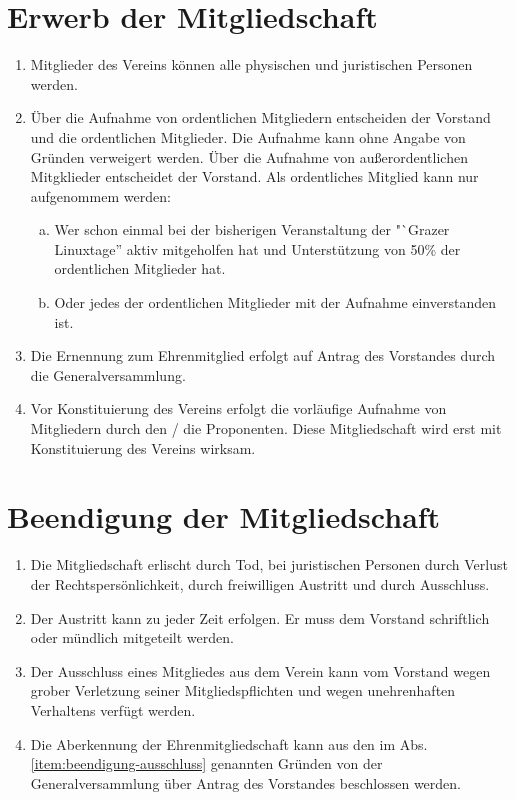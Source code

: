 \documentclass[a4paper,12pt]{article}
\begin{document}
\section{Erwerb der Mitgliedschaft} %
\label{sec:Mitgliedschaft-Erwerb}
\begin{enumerate}
\item Mitglieder des Vereins können alle physischen und juristischen Personen werden.
\item  Über die Aufnahme von ordentlichen Mitgliedern entscheiden der Vorstand und die ordentlichen Mitglieder. Die Aufnahme kann ohne Angabe von Gründen verweigert werden. Über die Aufnahme von außerordentlichen Mitgklieder entscheidet der Vorstand. Als ordentliches Mitglied kann nur aufgenommem werden:
\begin{enumerate}[(a)]
  \item Wer schon einmal bei der bisherigen Veranstaltung der "`Grazer Linuxtage'' aktiv mitgeholfen hat und Unterstützung von 50\% der ordentlichen Mitglieder hat.
  \item Oder jedes der ordentlichen Mitglieder mit der Aufnahme einverstanden ist.
\end{enumerate}
\item Die Ernennung zum Ehrenmitglied erfolgt auf Antrag des Vorstandes durch die Generalversammlung.
\item Vor Konstituierung des Vereins erfolgt die vorläufige Aufnahme von Mitgliedern durch den / die Proponenten. Diese Mitgliedschaft wird erst mit Konstituierung des Vereins wirksam.
\end{enumerate}

\section{Beendigung der Mitgliedschaft} %
\label{sec:Mitgliedschaft-Beendigung}
\begin{enumerate}
\item Die Mitgliedschaft erlischt durch Tod, bei juristischen Personen durch Verlust der Rechtspersönlichkeit, durch freiwilligen Austritt und durch Ausschluss.
\item Der Austritt kann zu jeder Zeit erfolgen. Er muss dem Vorstand schriftlich oder mündlich mitgeteilt werden.
\item\label{item:beendigung-ausschluss} Der Ausschluss eines Mitgliedes aus dem Verein kann vom Vorstand wegen grober Verletzung seiner Mitgliedspflichten und wegen unehrenhaften Verhaltens verfügt werden.
\item Die Aberkennung der Ehrenmitgliedschaft kann aus den im Abs. \ref{item:beendigung-ausschluss} genannten Gründen von der Generalversammlung über Antrag des Vorstandes beschlossen werden.
\end{enumerate}
\end{document}
